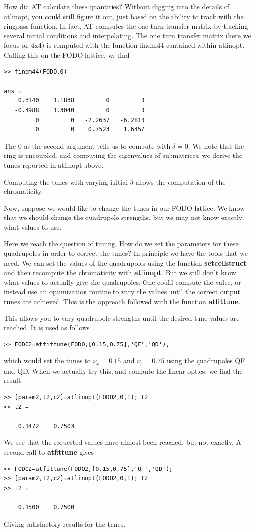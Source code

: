 \documentclass[acus]{article}
\newcommand{\mfun}[1]{{\bf{#1}}}
\begin{document}
How did AT calculate these quantities?  Without digging into the
details of atlinopt, you could still figure it out, just based on
the ability to track with the ringpass function.  In fact, AT computes
the one turn transfer matrix by tracking several initial conditions and
interpolating.  The one turn transfer matrix (here we focus on 4x4) is 
computed with the function findm44 contained within atlinopt.  
Calling this on the FODO lattice, we find
\begin{verbatim}
>> findm44(FODO,0)

ans =
    0.3140    1.1838         0         0
   -0.4988    1.3040         0         0
         0         0   -2.2637   -6.2810
         0         0    0.7523    1.6457
\end{verbatim}
The 0 as the second argument tells us to compute with $\delta=0$.
We note that the ring is uncoupled, and computing the eigenvalues of
submatrices, we derive the tunes reported in atlinopt above.

Computing the tunes with varying initial $\delta$ allows the 
computation of the chromaticity.  

Now, suppose we would like to change the tunes in our FODO lattice.  
We know that we should change the quadrupole strengths, but we may
not know exactly what values to use.

Here we reach the question of tuning.  How do we set the parameters for
these quadrupoles in order to correct the tunes?
In principle we have the tools that we need.  We can set the values
of the quadrupoles using the function \mfun{setcellstruct} and then
recompute the chromaticity with \mfun{atlinopt}.  But we still don't know what 
values to actually give the quadrupoles.  One could compute the
value, or instead use an optimization routine to vary the values
until the correct output tunes are achieved.  This is the
approach followed with the function \mfun{atfittune}.  

This allows you to vary quadrupole strengths until the desired tune
values are reached.  It is used as follows 
\begin{verbatim}
>> FODO2=atfittune(FODO,[0.15,0.75],'QF','QD');
\end{verbatim}
which would set the tunes to $\nu_x = 0.15$ and $\nu_y = 0.75$ using
the quadrupoles QF and QD. When we actually try this, and compute the
linear optics, we find the result
\begin{verbatim}
>> [param2,t2,c2]=atlinopt(FODO2,0,1); t2
>> t2 =

    0.1472    0.7503
\end{verbatim}
We see that the requested values have almost been reached, but not exactly.
A second call to \mfun{atfittune} gives
\begin{verbatim}
>> FODO2=atfittune(FODO2,[0.15,0.75],'QF','QD');
>> [param2,t2,c2]=atlinopt(FODO2,0,1); t2
>> t2 =

    0.1500    0.7500
\end{verbatim}
Giving satisfactory results for the tunes.
\end{document}
